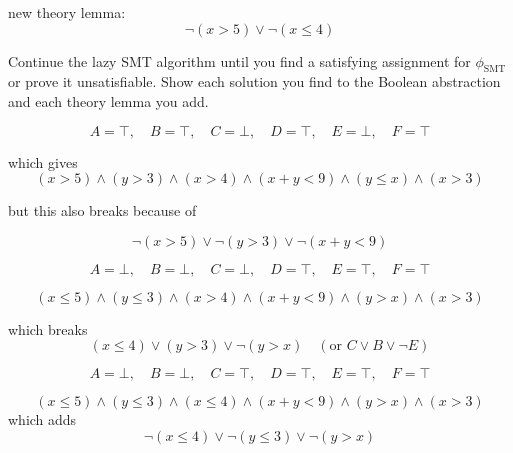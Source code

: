 \documentclass[11pt]{article}
\begin{document}
\begin{qunlist}
\begin{qparts}
\begin{answer}
      new theory lemma:
      \begin{equation}
        \lnot (x > 5) \lor \lnot (x \le 4)
      \end{equation}

    \end{answer}

  \item
    Continue the lazy SMT algorithm until you find a satisfying assignment for $\phi_{\text{SMT}}$ or prove it unsatisfiable.
    Show each solution you find to the Boolean abstraction and each theory lemma you add.

    \begin{answer}
      \begin{equation}
        A = \top, \quad B = \top, \quad C = \bot, \quad D = \top, \quad E = \bot, \quad F = \top
      \end{equation}

      which gives
      \begin{equation}
        (x > 5) \land (y > 3) \land (x > 4) \land (x + y < 9) \land (y \le x) \land (x > 3)
      \end{equation}

      but this also breaks because of

      \begin{equation}
        \lnot (x > 5) \lor \lnot (y > 3) \lor \lnot (x + y < 9)
      \end{equation}

      \begin{equation}
        A = \bot, \quad B = \bot, \quad C = \bot, \quad D = \top, \quad E = \top, \quad F = \top
      \end{equation}

      \begin{equation}
        (x \le 5) \land (y \le 3) \land (x > 4) \land (x + y < 9) \land (y > x) \land (x > 3)
      \end{equation}

      which breaks
      \begin{equation}
        (x \le 4) \lor (y > 3) \lor \lnot (y > x) \quad (\text{or } C \lor B \lor \lnot E)
      \end{equation}

      \begin{equation}
        A = \bot, \quad B = \bot, \quad C = \top, \quad D = \top, \quad E = \top, \quad F = \top
      \end{equation}

      \begin{equation}
        (x \le 5) \land (y \le 3) \land (x \le 4) \land (x + y < 9) \land (y > x) \land (x > 3)
      \end{equation}
      which adds
      \begin{equation}
        \lnot (x \le 4) \lor \lnot (y \le 3) \lor \lnot (y > x)
      \end{equation}


\end{answer}
\end{qparts}
\end{qunlist}
\end{document}

